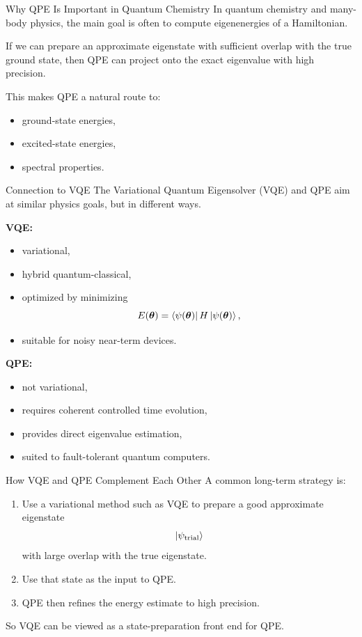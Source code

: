 \documentclass{beamer}
\begin{document}
\begin{frame}{Why QPE Is Important in Quantum Chemistry}
In quantum chemistry and many-body physics, the main goal is often to compute eigenenergies of a Hamiltonian.

If we can prepare an approximate eigenstate with sufficient overlap with the true ground state, then QPE can project onto the exact eigenvalue with high precision.

This makes QPE a natural route to:
\begin{itemize}
\item ground-state energies,
\item excited-state energies,
\item spectral properties.
\end{itemize}
\end{frame}

\begin{frame}{Connection to VQE}
The Variational Quantum Eigensolver (VQE) and QPE aim at similar physics goals, but in different ways.

\textbf{VQE:}
\begin{itemize}
\item variational,
\item hybrid quantum-classical,
\item optimized by minimizing
\[
E(\bm{\theta}) = \bra{\psi(\bm{\theta})} H \ket{\psi(\bm{\theta})},
\]
\item suitable for noisy near-term devices.
\end{itemize}

\textbf{QPE:}
\begin{itemize}
\item not variational,
\item requires coherent controlled time evolution,
\item provides direct eigenvalue estimation,
\item suited to fault-tolerant quantum computers.
\end{itemize}
\end{frame}

\begin{frame}{How VQE and QPE Complement Each Other}
A common long-term strategy is:
\begin{enumerate}
\item Use a variational method such as VQE to prepare a good approximate eigenstate
\[
\ket{\psi_{\mathrm{trial}}}
\]
with large overlap with the true eigenstate.

\item Use that state as the input to QPE.

\item QPE then refines the energy estimate to high precision.
\end{enumerate}

So VQE can be viewed as a state-preparation front end for QPE.
\end{frame}
\end{document}
